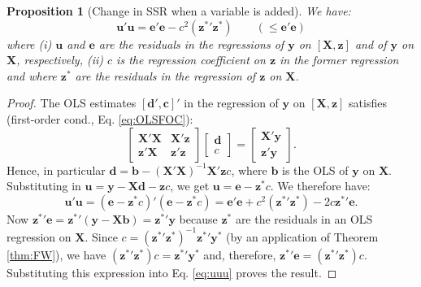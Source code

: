 \documentclass[
  11pt,
]{book}
\newtheorem{proposition}{Proposition}[chapter]
\theoremstyle{definition}
\theoremstyle{definition}
\theoremstyle{definition}
\theoremstyle{definition}
\theoremstyle{remark}
\begin{document}
\begin{proposition}[Change in SSR when a variable is added]
\protect\hypertarget{prp:chgeR2}{}\label{prp:chgeR2}We have:
\begin{equation}
\mathbf{u}'\mathbf{u} = \mathbf{e}'\mathbf{e} - c^2(\mathbf{z^*}'\mathbf{z^*}) \qquad (\le \mathbf{e}'\mathbf{e}) \label{eq:uu}
\end{equation}
where (i) \(\mathbf{u}\) and \(\mathbf{e}\) are the residuals in the regressions of \(\mathbf{y}\) on \([\mathbf{X},\mathbf{z}]\) and of \(\mathbf{y}\) on \(\mathbf{X}\), respectively, (ii) \(c\) is the regression coefficient on \(\mathbf{z}\) in the former regression and where \(\mathbf{z}^*\) are the residuals in the regression of \(\mathbf{z}\) on \(\mathbf{X}\).
\end{proposition}

\begin{proof}
The OLS estimates \([\mathbf{d}',\mathbf{c}]'\) in the regression of \(\mathbf{y}\) on \([\mathbf{X},\mathbf{z}]\) satisfies (first-order cond., Eq. \eqref{eq:OLSFOC}):
\[
\left[ \begin{array}{cc} \mathbf{X}'\mathbf{X} & \mathbf{X}'\mathbf{z} \\ \mathbf{z}'\mathbf{X} & \mathbf{z}'\mathbf{z}\end{array}\right]
\left[ \begin{array}{c} \mathbf{d} \\ c\end{array}\right] =
\left[ \begin{array}{c} \mathbf{X}' \mathbf{y} \\ \mathbf{z}' \mathbf{y} \end{array}\right].
\]
Hence, in particular \(\mathbf{d} = \mathbf{b} - (\mathbf{X}'\mathbf{X})^{-1}\mathbf{X}'\mathbf{z}c\), where \(\mathbf{b}\) is the OLS of \(\mathbf{y}\) on \(\mathbf{X}\). Substituting in \(\mathbf{u} = \mathbf{y} - \mathbf{X}\mathbf{d} - \mathbf{z}c\), we get \(\mathbf{u} = \mathbf{e} - \mathbf{z}^*c\). We therefore have:
\begin{equation}
\mathbf{u}'\mathbf{u} = (\mathbf{e} - \mathbf{z}^*c)'(\mathbf{e} - \mathbf{z}^*c)= \mathbf{e}'\mathbf{e} + c^2(\mathbf{z^*}'\mathbf{z^*}) - 2 c\mathbf{z^*}'\mathbf{e}.\label{eq:uuu}
\end{equation}
Now \(\mathbf{z^*}'\mathbf{e} = \mathbf{z^*}'(\mathbf{y} - \mathbf{X}\mathbf{b}) = \mathbf{z^*}'\mathbf{y}\) because \(\mathbf{z}^*\) are the residuals in an OLS regression on \(\mathbf{X}\). Since \(c = (\mathbf{z^*}'\mathbf{z^*})^{-1}\mathbf{z^*}'\mathbf{y^*}\) (by an application of Theorem \ref{thm:FW}), we have \((\mathbf{z^*}'\mathbf{z^*})c = \mathbf{z^*}'\mathbf{y^*}\) and, therefore, \(\mathbf{z^*}'\mathbf{e} = (\mathbf{z^*}'\mathbf{z^*})c\). Substituting this expression into Eq. \eqref{eq:uuu} proves the result.
\end{proof}
\end{document}
